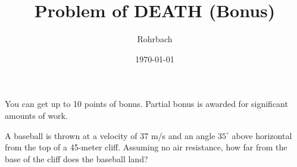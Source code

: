 \documentclass[11pt]{exam}
\title{Problem of DEATH (Bonus)}
\author{Rohrbach}
\date{\today}
\begin{document}
\maketitle

\noindent
You can get up to 10 points of bonus.  Partial bonus is awarded for significant amounts of work.

\vspace{2em}

A baseball is thrown at a velocity of 37 m/s and an angle $35^\circ$ above horizontal from the top of a 45-meter cliff.  Assuming no air resistance, how far from the base of the cliff does the baseball land?
\end{document}
